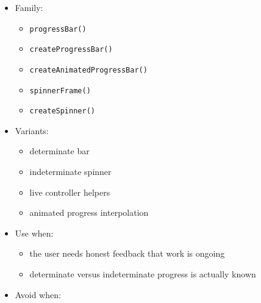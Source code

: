 \begin{itemize}
\tightlist
\item
  Family:

  \begin{itemize}
  \tightlist
  \item
    \texttt{p\allowbreak{}r\allowbreak{}o\allowbreak{}g\allowbreak{}r\allowbreak{}e\allowbreak{}s\allowbreak{}s\allowbreak{}B\allowbreak{}a\allowbreak{}r\allowbreak{}(\allowbreak{})}
  \item
    \texttt{c\allowbreak{}r\allowbreak{}e\allowbreak{}a\allowbreak{}t\allowbreak{}e\allowbreak{}P\allowbreak{}r\allowbreak{}o\allowbreak{}g\allowbreak{}r\allowbreak{}e\allowbreak{}s\allowbreak{}s\allowbreak{}B\allowbreak{}a\allowbreak{}r\allowbreak{}(\allowbreak{})}
  \item
    \texttt{c\allowbreak{}r\allowbreak{}e\allowbreak{}a\allowbreak{}t\allowbreak{}e\allowbreak{}A\allowbreak{}n\allowbreak{}i\allowbreak{}m\allowbreak{}a\allowbreak{}t\allowbreak{}e\allowbreak{}d\allowbreak{}P\allowbreak{}r\allowbreak{}o\allowbreak{}g\allowbreak{}r\allowbreak{}e\allowbreak{}s\allowbreak{}s\allowbreak{}B\allowbreak{}a\allowbreak{}r\allowbreak{}(\allowbreak{})}
  \item
    \texttt{s\allowbreak{}p\allowbreak{}i\allowbreak{}n\allowbreak{}n\allowbreak{}e\allowbreak{}r\allowbreak{}F\allowbreak{}r\allowbreak{}a\allowbreak{}m\allowbreak{}e\allowbreak{}(\allowbreak{})}
  \item
    \texttt{c\allowbreak{}r\allowbreak{}e\allowbreak{}a\allowbreak{}t\allowbreak{}e\allowbreak{}S\allowbreak{}p\allowbreak{}i\allowbreak{}n\allowbreak{}n\allowbreak{}e\allowbreak{}r\allowbreak{}(\allowbreak{})}
  \end{itemize}
\item
  Variants:

  \begin{itemize}
  \tightlist
  \item
    determinate bar
  \item
    indeterminate spinner
  \item
    live controller helpers
  \item
    animated progress interpolation
  \end{itemize}
\item
  Use when:

  \begin{itemize}
  \tightlist
  \item
    the user needs honest feedback that work is ongoing
  \item
    determinate versus indeterminate progress is actually known
  \end{itemize}
\item
  Avoid when:


\end{itemize}

